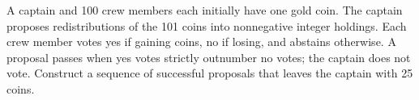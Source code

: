 A captain and 100 crew members each initially have one gold coin. The captain proposes redistributions of the 101 coins into nonnegative integer holdings. Each crew member votes yes if gaining coins, no if losing, and abstains otherwise. A proposal passes when yes votes strictly outnumber no votes; the captain does not vote. Construct a sequence of successful proposals that leaves the captain with 25 coins.
